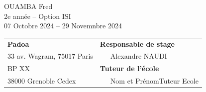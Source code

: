 \begin{center}
OUAMBA Fred\\
2e année -- Option ISI\\
\vspace{3mm}
07 Octobre 2024 -- 29 Novemnbre 2024\\
\vspace{4cm}
\begin{tabular}{p{10cm}p{10cm}}
{\bf Padoa}                                            &{\bf Responsable de stage}\\
{\footnotesize 33 av. Wagram, 75017 Paris}       & ~~~Alexandre NAUDI\\
{\footnotesize BP XX}                                        & {\bf Tuteur de l'école}\\
{\footnotesize 38000 Grenoble Cedex}                          & ~~~Nom et PrénomTuteur Ecole\\
\end{tabular}
\end{center}



